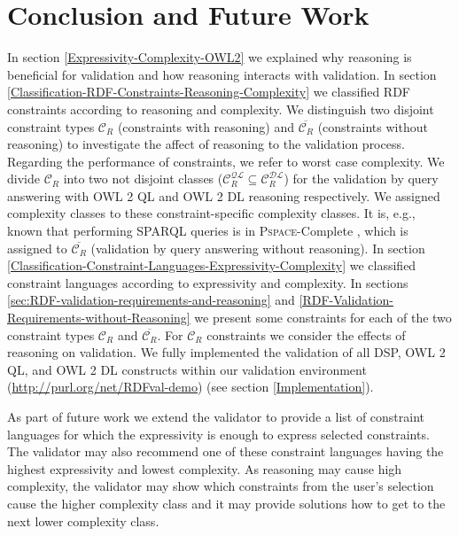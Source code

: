 \documentclass{llncs}
\begin{document}
\section{Conclusion and Future Work}

In section \ref{Expressivity-Complexity-OWL2} we explained why reasoning is beneficial for validation and how reasoning interacts with validation.
In section \ref{Classification-RDF-Constraints-Reasoning-Complexity} we classified RDF constraints according to reasoning and complexity.
We distinguish two disjoint constraint types $\mathcal{C}_{R}$ (constraints with reasoning) and $\overline{\mathcal{C}_{R}}$ (constraints without reasoning) to investigate the affect of reasoning to the validation process.
Regarding the performance of constraints, we refer to worst case complexity.
We divide $\mathcal{C}_R$ into two not disjoint classes ($\mathcal{C}_R ^{\mathcal{QL}} \subseteq \mathcal{C}_R ^{\mathcal{DL}}$) for the validation by query answering with OWL 2 QL and OWL 2 DL reasoning respectively.
We assigned complexity classes to these constraint-specific complexity classes.
It is, e.g., known that performing SPARQL queries is in \textsc{Pspace}-Complete \cite{Perez2009}, 
which is assigned to $\overline{\mathcal{C}_R}$ (validation by query answering without reasoning).
In section \ref{Classification-Constraint-Languages-Expressivity-Complexity} we classified constraint languages according to expressivity and complexity.
In sections 
\ref{sec:RDF-validation-requirements-and-reasoning} and
\ref{RDF-Validation-Requirements-without-Reasoning}
we present some constraints for each of the two constraint types $\mathcal{C}_{R}$ and $\overline{\mathcal{C}_{R}}$.
For $\mathcal{C}_{R}$ constraints we consider the effects of reasoning on validation.
We fully implemented the validation of all DSP, OWL 2 QL, and OWL 2 DL constructs
within our validation environment (\url{http://purl.org/net/RDFval-demo}) (see section \ref{Implementation}).

As part of future work we extend the validator to provide a list of constraint languages for which the expressivity is enough to express selected constraints.
The validator may also recommend one of these constraint languages having the highest expressivity and lowest complexity.
As reasoning may cause high complexity, the validator may show which constraints from the user's selection cause the higher complexity class 
and it may provide solutions how to get to the next lower complexity class.


{}

\setcounter{tocdepth}{1}
\end{document}
